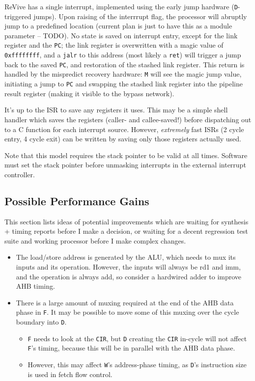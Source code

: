 \documentclass{article}
\begin{document}
ReVive has a single interrupt, implemented using the early jump hardware (\texttt{D}-triggered jumps). Upon raising of the interrrupt flag, the processor will abruptly jump to a predefined location (current plan is just to have this as a module parameter -- TODO). No state is saved on interrupt entry, except for the link register and the \texttt{PC}; the link register is overwritten with a magic value of \texttt{0xffffffff}, and a \texttt{jalr} to this address (most likely a \texttt{ret}) will trigger a jump back to the saved \texttt{PC}, and restoration of the stashed link register. This return is handled by the mispredict recovery hardware: \texttt{M} will see the magic jump value, initiating a jump to \texttt{PC} and swapping the stashed link register into the pipeline result register (making it visible to the bypass network).

It's up to the ISR to save any registers it uses. This may be a simple shell handler which saves the registers (caller- and callee-saved!) before dispatching out to a C function for each interrupt source. However, \textit{extremely} fast ISRs (2 cycle entry, 4 cycle exit) can be written by saving only those registers actually used.

Note that this model requires the stack pointer to be valid at all times. Software must set the stack pointer before unmasking interrupts in the external interrupt controller.

\subsection{Possible Performance Gains}

This section lists ideas of potential improvements which are waiting for synthesis + timing reports before I make a decision, or waiting for a decent regression test suite and working processor before I make complex changes.

\begin{itemize}
	\item The load/store address is generated by the ALU, which needs to mux its inputs and its operation. However, the inputs will always be rd1 and imm, and the operation is always add, so consider a hardwired adder to improve AHB timing.
	\item There is a large amount of muxing required at the end of the AHB data phase in \texttt{F}. It may be possible to move some of this muxing over the cycle boundary into \texttt{D}.
	\begin{itemize}
		\item \texttt{F} needs to look at the \texttt{CIR}, but \texttt{D} creating the \texttt{CIR} in-cycle will not affect \texttt{F}'s timing, because this will be in parallel with the AHB data phase.
		\item However, this may affect \texttt{W}'s address-phase timing, as \texttt{D}'s instruction size is used in fetch flow control.
	\end{itemize}
\end{itemize}
\end{document}

